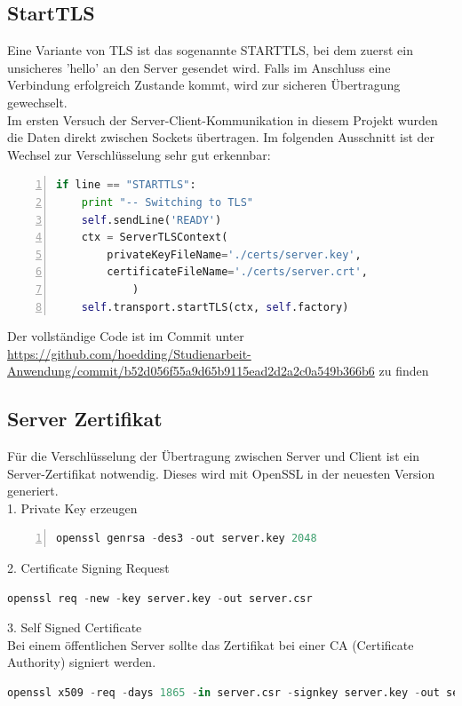 \subsection{StartTLS}
Eine Variante von TLS ist das sogenannte STARTTLS, bei dem zuerst ein unsicheres 'hello' an den Server gesendet wird. Falls im Anschluss eine Verbindung erfolgreich Zustande kommt, wird zur sicheren Übertragung gewechselt. \\
Im ersten Versuch der Server-Client-Kommunikation in diesem Projekt wurden die Daten direkt zwischen Sockets übertragen. Im folgenden Ausschnitt ist der Wechsel zur Verschlüsselung sehr gut erkennbar: 
\begin{lstlisting}[caption = Starttls - Wechsel zur Verschlüsselung, language=python, frame=single, breaklines=true,columns=fullflexible, commentstyle=\color{gray}\upshape, captionpos=b, numbers = left]
if line == "STARTTLS":
	print "-- Switching to TLS"
	self.sendLine('READY')
	ctx = ServerTLSContext(
		privateKeyFileName='./certs/server.key',
		certificateFileName='./certs/server.crt',
			)
	self.transport.startTLS(ctx, self.factory)
\end{lstlisting}
Der vollständige Code ist im Commit unter \url{https://github.com/hoedding/Studienarbeit-Anwendung/commit/b52d056f55a9d65b9115ead2d2a2c0a549b366b6} zu finden

\subsection{Server Zertifikat}
Für die Verschlüsselung der Übertragung zwischen Server und Client ist ein Server-Zertifikat notwendig. Dieses wird mit OpenSSL in der neuesten Version generiert. \\
1. Private Key erzeugen
\begin{lstlisting}[caption =private Key, language=python, frame=single, breaklines=true,columns=fullflexible, commentstyle=\color{gray}\upshape, captionpos=b, numbers = left]
openssl genrsa -des3 -out server.key 2048
\end{lstlisting}

2. Certificate Signing Request
\begin{lstlisting}[caption =Certificate Signing Request, language=python, frame=single, breaklines=true,columns=fullflexible, commentstyle=\color{gray}\upshape, captionpos=b]
openssl req -new -key server.key -out server.csr
\end{lstlisting}


3. Self Signed Certificate\\
Bei einem öffentlichen Server sollte das Zertifikat bei einer CA (Certificate Authority) signiert werden. \\
\begin{lstlisting}[caption =Self Signed Certificate, language=python, frame=single, breaklines=true,columns=fullflexible, commentstyle=\color{gray}\upshape, captionpos=b]
openssl x509 -req -days 1865 -in server.csr -signkey server.key -out server.crt
\end{lstlisting}

